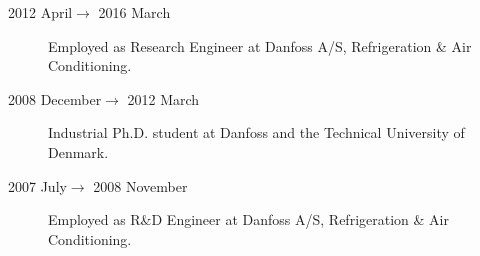 \documentclass[margin,line,a4paper]{resume}
\begin{document}
\begin{resume}
\begin{description}
\item[2012 April$\rightarrow$ 2016 March] Employed as Research Engineer at Danfoss A/S, Refrigeration \& Air Conditioning.%
  
\item[2008 December$\rightarrow$ 2012 March] Industrial Ph.D. student at Danfoss and the Technical University of Denmark. %
  
\item[2007 July$\rightarrow$ 2008 November] Employed as R\&D Engineer at Danfoss A/S, Refrigeration \& Air Conditioning. %
  

\end{description}
\end{resume}
\end{document}
